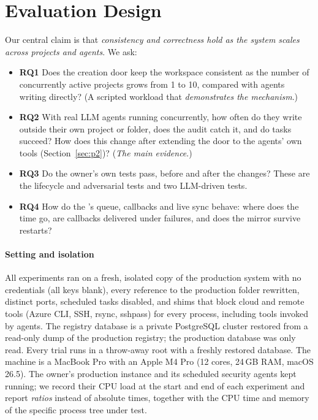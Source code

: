 \section{Evaluation Design}\label{sec:method}
Our central claim is that \emph{consistency and correctness hold as the system scales across projects and agents}. We ask:
\begin{itemize}
\item \textbf{RQ1} Does the creation door keep the workspace consistent as the number of concurrently active projects grows from 1 to 10, compared with agents writing directly? (A scripted workload that \emph{demonstrates the mechanism}.)
\item \textbf{RQ2} With real LLM agents running concurrently, how often do they write outside their own project or folder, does the audit catch it, and do tasks succeed? How does this change after extending the door to the agents' own tools (Section~\ref{sec:p2})? (\emph{The main evidence}.)
\item \textbf{RQ3} Do the owner's own tests pass, before and after the changes? These are the lifecycle and adversarial tests and two LLM-driven tests.
\item \textbf{RQ4} How do the \hub's queue, callbacks and live sync behave: where does the time go, are callbacks delivered under failures, and does the mirror survive restarts?
\end{itemize}

\paragraph*{Setting and isolation} All experiments ran on a fresh, isolated copy of the production system with no credentials (all keys blank), every reference to the production folder rewritten, distinct ports, scheduled tasks disabled, and shims that block cloud and remote tools (Azure CLI, SSH, rsync, sshpass) for every process, including tools invoked by agents. The registry database is a private PostgreSQL cluster restored from a read-only dump of the production registry; the production database was only read. Every trial runs in a throw-away root with a freshly restored database. The machine is a MacBook Pro with an Apple M4 Pro (12 cores, 24\,GB RAM, macOS 26.5). The owner's production instance and its scheduled security agents kept running; we record their CPU load at the start and end of each experiment and report \emph{ratios} instead of absolute times, together with the CPU time and memory of the specific process tree under test.


